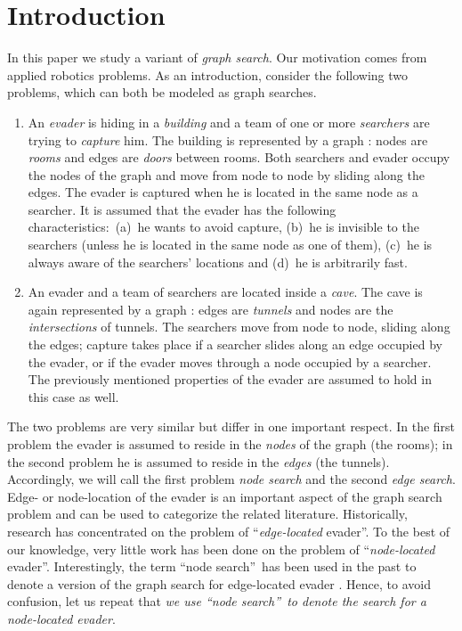 \documentclass[11pt]{article}\usepackage{amsmath}
\begin{document}
\section{Introduction}

\label{sec01}

In this paper we study a variant of \emph{graph search}. Our motivation comes
from applied robotics problems. As an introduction, consider the following two
problems, which can both be modeled as graph searches.

\begin{enumerate}
\item An \emph{evader} is hiding in a \emph{building} and a team of one or
more \emph{searchers} are trying to \emph{capture} him. The building is
represented by a graph : nodes are \emph{rooms} and edges are
\emph{doors} between rooms. Both searchers and evader occupy the nodes of the
graph and move from node to node by sliding along the edges. The evader is
captured when he is located in the same node as a searcher. It is assumed that
the evader has the following characteristics:\ (a)\ he wants to avoid capture,
(b)\ he is invisible to the searchers (unless he is located in the same node
as one of them), (c)\ he is always aware of the searchers' locations and
(d)\ he is arbitrarily fast.

\item An evader and a team of searchers are located inside a \emph{cave}. The
cave is again represented by a graph : edges are \emph{tunnels}
and nodes are the \emph{intersections} of tunnels. The searchers move from
node to node, sliding along the edges; capture takes place if a searcher
slides along an edge occupied by the evader, or if the evader moves through a
node occupied by a searcher. The previously mentioned properties of the evader
are assumed to hold in this case as well.
\end{enumerate}

The two problems are very similar but differ in one important respect. In the
first problem the evader is assumed to reside in the \emph{nodes} of the graph
(the rooms); in the second problem he is assumed to reside in the \emph{edges}
(the tunnels). Accordingly, we will call the first problem \emph{node search}
and the second \emph{edge search}. Edge- or node-location of the evader is an
important aspect of the graph search problem and can be used to categorize the
related literature. Historically, research has concentrated on the problem of
\textquotedblleft\emph{edge-located} evader\textquotedblright. To the best of
our knowledge, very little work has been done on the problem of
\textquotedblleft\emph{node-located} evader\textquotedblright. Interestingly,
the term \textquotedblleft node search\textquotedblright\ has been used in the
past to denote a version of the graph search for edge-located evader
\cite{Kiroussis}. Hence, to avoid confusion, let us repeat that \emph{we use
\textquotedblleft node search\textquotedblright\ to denote the search for a
node-located evader}.\emph{ }
\end{document}
